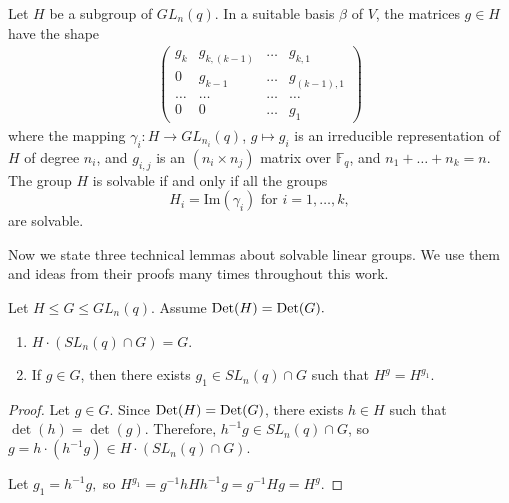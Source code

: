 \begin{Lem}
\label{supreduce}
Let  $H$ be a
subgroup of $GL_n(q)$. In a suitable basis $\beta$ of $V$, the matrices $g\in H$ have the
shape
\begin{gather}\label{stup}
\begin{pmatrix}
g_k     & g_{k,(k-1)} & \ldots & g_{k,1}  \\
0          &    g_{k-1}  & \ldots & g_{(k-1),1}  \\
\ldots     & \ldots     & \ldots & \ldots     \\
      0    &   0        & \ldots & g_1 
\end{pmatrix}
\end{gather}
where the mapping $\gamma_i: H \to GL_{n_i}(q)$, $g \mapsto g_i$ is an irreducible 
representation of $H$ of degree $n_i$, and $g_{i,j}$ is an $(n_i \times n_j)$ matrix over $\mathbb{F}_q$, and $n _1 + \ldots + n _k = n$.
 The group $H$  is solvable if and only if all the
groups
$$H_i ={\mathrm{Im} } (\gamma_i) \text{ for } i = 1, \ldots, k,$$
are solvable.
\end{Lem}

 Now we state three technical lemmas about solvable linear groups. We use them and ideas from their proofs many times throughout  this work. 

\begin{Lem}\label{supSL}
Let $H \le G \le GL_n(q).$ Assume $\mathrm{Det}(H)=\mathrm{Det}(G).$ 
\begin{enumerate}[font=\normalfont]
\item $H \cdot (SL_n(q) \cap G)=G$.
\item If $g \in G$, then there exists $g_1 \in SL_n(q) \cap G$ such that $H^g=H^{g_1}.$ 
\end{enumerate}
\end{Lem}
\begin{proof}
Let $g \in G$. Since $\mathrm{Det}(H)=\mathrm{Det}(G)$, there exists $h \in H$ such that $\det(h)=\det(g).$ Therefore, 
$h^{-1}g \in SL_n(q) \cap G$, so $g=h \cdot (h^{-1}g)\in H \cdot (SL_n(q) \cap G).$

Let $g_1=h^{-1}g,$ so $H^{g_1}=g^{-1}hHh^{-1}g=g^{-1}Hg=H^g.$
\end{proof}

